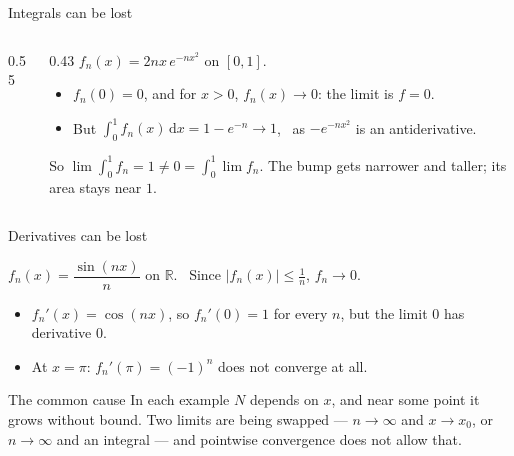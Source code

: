 \documentclass{wosm-slides}
\newcommand{\R}{\mathbb{R}}
\newcommand{\dx}{\,\mathrm{d}x}
\begin{document}
\begin{frame}{Integrals can be lost}
  \begin{columns}[c]
    \begin{column}{0.55\textwidth}
    \end{column}
    \begin{column}{0.43\textwidth}
      $f_n(x) = 2nx\, e^{-nx^2}$ on $[0, 1]$.
      \begin{itemize}
        \item $f_n(0) = 0$, and for $x > 0$, $f_n(x) \to 0$: the limit is $f = 0$.
        \item But $\int_0^1 f_n(x)\dx = 1 - e^{-n} \to 1$, \
          as $-e^{-nx^2}$ is an antiderivative.
      \end{itemize}
      So $\lim \int_0^1 f_n = 1 \ne 0 = \int_0^1 \lim f_n$.
      \small The bump gets narrower and taller; its area stays near $1$.
    \end{column}
  \end{columns}
\end{frame}

\begin{frame}{Derivatives can be lost}
  \begin{example}
    $f_n(x) = \dfrac{\sin(nx)}{n}$ on $\R$. \ Since $|f_n(x)| \le \frac1n$, $f_n \to 0$.
    \begin{itemize}
      \item $f_n'(x) = \cos(nx)$, so $f_n'(0) = 1$ for every $n$, but the limit $0$ has
        derivative $0$.
      \item At $x = \pi$: $f_n'(\pi) = (-1)^n$ does not converge at all.
    \end{itemize}
  \end{example}
  \pause
  \begin{block}{The common cause}
    In each example $N$ depends on $x$, and near some point it grows without bound.
    Two limits are being swapped --- $n \to \infty$ and $x \to x_0$, or $n \to \infty$ and
    an integral --- and pointwise convergence does not allow that.
  \end{block}
\end{frame}
\end{document}
